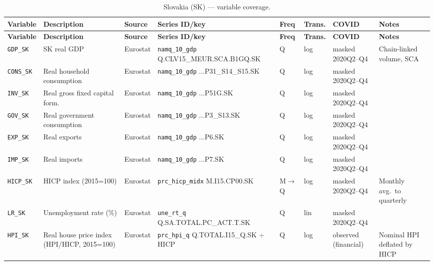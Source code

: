 {\footnotesize
\begin{longtable}{@{}p{1.9cm}p{2.9cm}p{1.5cm}p{2.7cm}p{0.7cm}p{1.0cm}p{1.6cm}p{2.4cm}@{}}
\caption{Slovakia (SK) --- variable coverage.}\label{tab:data:SK}\\
\toprule
\textbf{Variable} & \textbf{Description} & \textbf{Source} & \textbf{Series ID/key} & \textbf{Freq} & \textbf{Trans.} & \textbf{COVID} & \textbf{Notes} \\
\midrule \endfirsthead
\toprule
\textbf{Variable} & \textbf{Description} & \textbf{Source} & \textbf{Series ID/key} & \textbf{Freq} & \textbf{Trans.} & \textbf{COVID} & \textbf{Notes} \\
\midrule \endhead
\bottomrule \endfoot
\texttt{GDP\_SK}      & SK real GDP                       & Eurostat & \texttt{namq\_10\_gdp} Q.\allowbreak CLV15\_MEUR.\allowbreak SCA.\allowbreak B1GQ.\allowbreak SK       & Q & log & masked 2020Q2--Q4 & Chain-linked volume, SCA \\
\texttt{CONS\_SK}     & Real household consumption        & Eurostat & \texttt{namq\_10\_gdp} ...P31\_S14\_S15.SK             & Q & log & masked 2020Q2--Q4 & \\
\texttt{INV\_SK}      & Real gross fixed capital form.    & Eurostat & \texttt{namq\_10\_gdp} ...P51G.SK                      & Q & log & masked 2020Q2--Q4 & \\
\texttt{GOV\_SK}      & Real government consumption       & Eurostat & \texttt{namq\_10\_gdp} ...P3\_S13.SK                   & Q & log & masked 2020Q2--Q4 & \\
\texttt{EXP\_SK}      & Real exports                      & Eurostat & \texttt{namq\_10\_gdp} ...P6.SK                        & Q & log & masked 2020Q2--Q4 & \\
\texttt{IMP\_SK}      & Real imports                      & Eurostat & \texttt{namq\_10\_gdp} ...P7.SK                        & Q & log & masked 2020Q2--Q4 & \\
\texttt{HICP\_SK}     & HICP index (2015=100)             & Eurostat & \texttt{prc\_hicp\_midx} M.I15.CP00.SK                 & M$\to$Q & log & masked 2020Q2--Q4 & Monthly avg.\ to quarterly \\
\texttt{LR\_SK}       & Unemployment rate (\%)            & Eurostat & \texttt{une\_rt\_q} Q.SA.TOTAL.PC\_ACT.T.SK            & Q & lin & masked 2020Q2--Q4 & \\
\texttt{HPI\_SK}      & Real house price index (HPI/HICP, 2015=100) & Eurostat & \texttt{prc\_hpi\_q} Q.TOTAL.I15\_Q.SK $\div$ HICP & Q & log & observed (financial) & Nominal HPI deflated by HICP \\

\end{longtable}}
